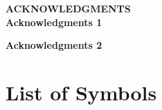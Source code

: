 \documentclass[11pt]{report} %
\begin{document}
\begin{titlepage}
\begin{center}

\begin{Large}

\vspace*{1cm}
\textbf{ACKNOWLEDGMENTS}\\[3.5cm]

\textbf{Acknowledgments 1}\\

\end{Large}

\begin{Large}

\vspace*{3cm}

\textbf{Acknowledgments 2}\\

\end{Large}

\vfill

\end{center}
\end{titlepage}



\tableofcontents




\cleardoublepage
\listoffigures


\cleardoublepage
\listoftables


\cleardoublepage
\chapter*{List of Symbols}
\end{document}

